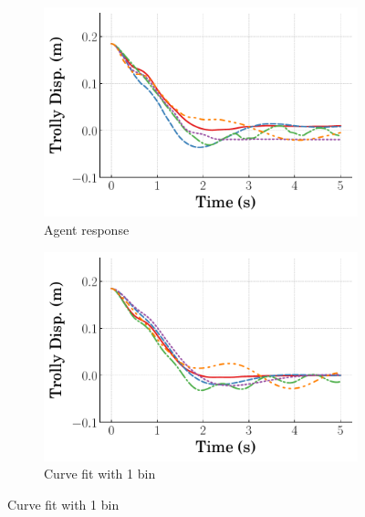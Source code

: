 %
\begin{figure}
    \centering
    \begin{subfigure}[b]{0.32\textwidth}
        \centering
        \includegraphics[width=\textwidth]{figures/figures_Interpretability/Mean_ISE_dpcrane_cubic_1_bins/curve_fit_time_responses/RL_PD_LA/agent_0p18_Trolly_Disp.pdf}
        \caption{Agent response}
        \label{subfig_chap5:dpcrane_RL_PD_LA_trolley_0.185_init_agent_unclipped}
    \end{subfigure}
    \hfill
    \begin{subfigure}[b]{0.32\textwidth}
        \centering
        \includegraphics[width=\textwidth]{figures/figures_Interpretability/Mean_ISE_dpcrane_cubic_1_bins/curve_fit_time_responses/RL_PD_LA/curve_fit_0p18_Trolly_Disp.pdf}
        \caption{Curve fit with 1 bin}
        \label{subfig_chap5:dpcrane_RL_PD_LA_trolley_0.185_init_curve_fit_1_bins_unclipped}

\end{subfigure}
\end{figure}
